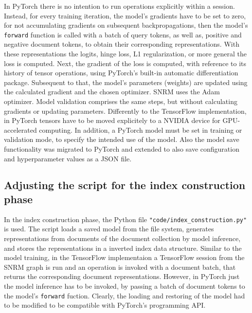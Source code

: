 In PyTorch there is no intention to run operations explicitly within a session.
Instead, for every training iteration, the model's gradients have to be set to zero, for not accumulating gradients
    on subsequent backpropagations, 
    then the model's \texttt{forward} function is called with a batch of query tokens, 
    as well as, positive and negative document tokens,
    to obtain their corresponding representations.
With these representations the logits, hinge loss, L1 regularization, or more general the loss is computed.
Next, the gradient of the loss is computed, with reference to its history of tensor operations, using
    PyTorch's built-in automatic differentiation package.
Subsequent to that, the model's parameters (weights) are updated using the calculated gradient and 
    the chosen optimizer.
SNRM uses the Adam optimizer.
Model validation comprises the same steps, but without calculating gradients or updating parameters.
Differently to the TensorFlow implementation, in PyTorch tensors have to be moved explicitely to 
    a NVIDIA device for GPU-accelerated computing.
In addition, a PyTorch model must be set in training or validation mode,
    to specify the intended use of the model.
Also the model save functionality was migrated to PyTorch and extended to also save
    configuration and hyperparameter values as a JSON file.

\subsection{Adjusting the script for the index construction phase}
In the index construction phase, the Python file \texttt{"code/index\_construction.py"} is used.
The script loads a saved model from the file system, generates representations from 
    documents of the document collection by model inference, and stores the representations in
    a inverted index data structure.
Similar to the model training, in the TensorFlow implementaion a TensorFlow session from the SNRM graph is
    run and an operation is invoked with a document batch, that returns the corresponding document 
    representations.
However, in PyTorch just the model inference has to be invoked, by passing a batch of document tokens 
    to the model's \texttt{forward} fuction.
Clearly, the loading and restoring of the model had to be modified to be compatible with PyTorch's 
    programming API.

